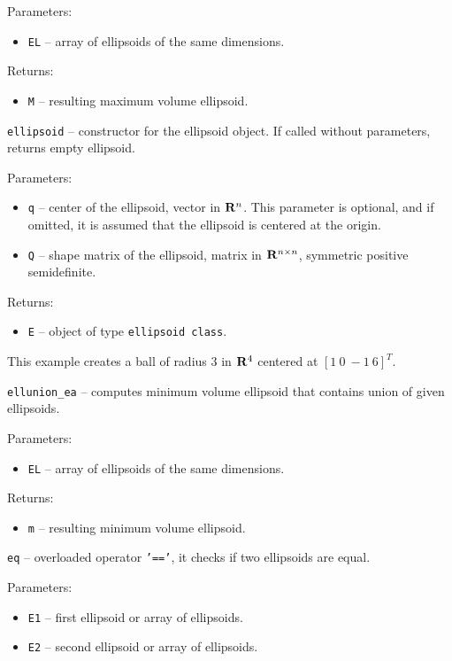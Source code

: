 Parameters:
\begin{itemize}
\item {\tt EL} -- array of ellipsoids of the same dimensions.
\end{itemize}
Returns:
\begin{itemize}
\item {\tt M} -- resulting maximum volume ellipsoid.
\end{itemize}
\newpage
{\Large {\tt ellipsoid}} -- constructor for the ellipsoid object.
If called without parameters, returns empty ellipsoid.

Parameters:
\begin{itemize}
\item {\tt q} -- center of the ellipsoid, vector in ${\bf R}^n$.
This parameter is optional, and if omitted, it is assumed that the ellipsoid
is centered at the origin.
\item {\tt Q} -- shape matrix of the ellipsoid, matrix in ${\bf R}^{n\times n}$,
symmetric positive semidefinite.
\end{itemize}
Returns:
\begin{itemize}
\item {\tt E} -- object of type {\tt ellipsoid class}.
\end{itemize}

This example creates a ball of radius $3$ in ${\bf R}^4$ centered at $[1 ~ 0 ~ -1 ~ 6]^T$.

\newpage

{\Large {\tt ellunion\_ea}} -- computes minimum volume ellipsoid that contains union
of given ellipsoids.

Parameters:
\begin{itemize}
\item {\tt EL} -- array of ellipsoids of the same dimensions.
\end{itemize}
Returns:
\begin{itemize}
\item {\tt m} -- resulting minimum volume ellipsoid.
\end{itemize}

\newpage
{\Large {\tt eq}} -- overloaded operator {\tt '=='},
it checks if two ellipsoids are equal.

Parameters:
\begin{itemize}
\item {\tt E1} -- first ellipsoid or array of ellipsoids.
\item {\tt E2} -- second ellipsoid or array of ellipsoids.
\end{itemize}

